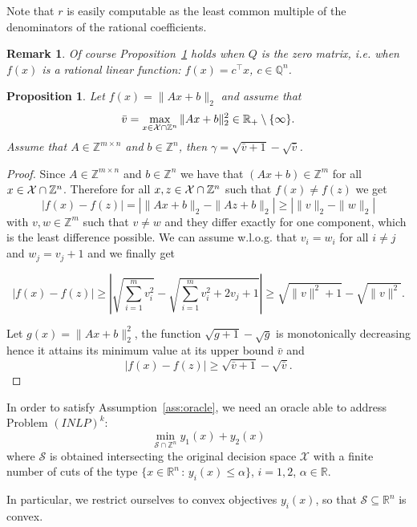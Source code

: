 \documentclass[preprint,12pt]{elsarticle}
\newtheorem{proposition}[theorem]{Proposition}
\newtheorem{remark}[theorem]{Remark}
\def\X{{\cal X}}
\def\R{\mathbb{R}}
\def\Q{\mathbb{Q}}
\def\Z{\mathbb{Z}}
\begin{document}
Note that $r$ is easily computable as the least common multiple of the denominators of the rational coefficients.
\begin{remark}
Of course Proposition~\ref{prop:condquad}  holds when $Q$ is the zero matrix, i.e. when $f(x)$ is a rational linear function: $f(x) = c^\top x $,  $c \in \Q^n$.
\end{remark}

\begin{proposition}\label{prop:condquad}
Let $f(x) =\|A x+ b\|_2 $ and assume that $$\bar v=\max_{x \in \X\cap \Z^n} \|A x+ b\|^2_2 \in \R_+\setminus \{\infty\}.$$
Assume that $A \in \Z^{m\times n}$ and $b \in \Z^n$, then  $\gamma = \sqrt{\bar v+1}-\sqrt{\bar v}$.
\end{proposition}
\begin{proof}
Since $A \in \Z^{m\times n}$ and $b \in \Z^n$
we have that $(Ax+b)\in \Z^m$
for all $x \in \X\cap \Z^n$.
Therefore for all $x,z \in \X\cap \Z^n$ such that $f(x) \neq f(z)$ we get
\[
| f(x) - f(z) | = \left |\|A x+ b\|_2 -\|A z+ b\|_2\right|\ge
\left |\|v\|_2 -\|w\|_2\right|
\]
with $v, w\in \Z^m$ such that $v\neq w$ and they differ exactly for one component, which is the least difference possible.
 We can assume  w.l.o.g. that $ v_i= w_i$ for all $i\neq j$ and $ w_j= v_j+1$ and we finally get

\[
| f(x) - f(z) | \ge  \left |\sqrt{\sum_{i=1}^m v_i^2} -\sqrt{\sum_{i=1}^m v_i^2+2v_j+1}\right|\ge \sqrt{\|v\|^2+1}-\sqrt{\|v\|^2}.
\]

Let $g(x)=\|A x+ b\|^2_2$, the function $\sqrt{g+1}-\sqrt{g}$ is monotonically decreasing hence it attains its minimum value at its upper bound $\bar v$ and
\[
| f(x) - f(z) | \ge   \sqrt{\bar v+1}-\sqrt{\bar v}.
\]
\end{proof}

In order to satisfy Assumption~\ref{ass:oracle}, we need an oracle able to address Problem $(INLP)^k$:
\begin{equation*}
    \min_{\mathcal{S}\cap \Z^n} y_1(x) + y_2(x)
 \end{equation*}
where $\mathcal{S}$ is obtained intersecting the original decision space $\mathcal{X}$ with a finite number of cuts
of the type $\{x\in \R^n \,:\,y_i(x)\leq \alpha\}$, $i=1,2$, $\alpha\in \R$.

In particular, we restrict ourselves to convex objectives $y_i(x)$, so that $\mathcal{S}\subseteq \R^n$ is convex.
\end{document}
